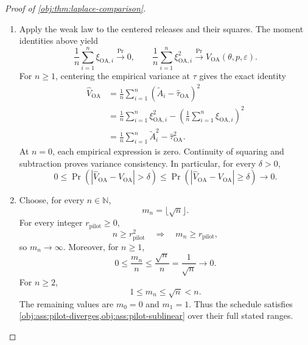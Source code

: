 \begin{proof}[Proof of \cref{obj:thm:laplace-comparison}]
\begin{enumerate}
For every positive integer \(n\), factoring out \(\sqrt n\) from both square roots and canceling the positive common factor \(z_{1-\gamma/2}/\sqrt n\) gives
\[
\begin{aligned}
\frac{z_{1-\gamma/2}\sqrt{V_{\mathrm{OA}}(\theta,p,\varepsilon)/n}}
     {z_{1-\gamma/2}\sqrt{V^*(\theta,p,\varepsilon)/n}}
&=
\frac{\sqrt{V_{\mathrm{OA}}(\theta,p,\varepsilon)}}
     {\sqrt{V^*(\theta,p,\varepsilon)}}\\
&=
\sqrt{\frac{V_{\mathrm{OA}}(\theta,p,\varepsilon)}
           {V^*(\theta,p,\varepsilon)}}.
\end{aligned}
\]
The identities also respect the zero-reciprocal convention. The sequence is consequently equal to its claimed limit for every \(n\ge1\).

\item Apply the weak law to the centered releases and their squares. The moment identities above yield
\[
\frac1n\sum_{i=1}^n\xi_{\mathrm{OA},i}
\xrightarrow{\Pr}0,
\qquad
\frac1n\sum_{i=1}^n\xi_{\mathrm{OA},i}^2
\xrightarrow{\Pr}V_{\mathrm{OA}}(\theta,p,\varepsilon).
\]
For \(n\ge1\), centering the empirical variance at \(\tau\) gives the exact identity
\[
\begin{aligned}
\widehat V_{\mathrm{OA}}
&=
\frac1n\sum_{i=1}^n
(\widetilde A_i-\widehat\tau_{\mathrm{OA}})^2\\
&=
\frac1n\sum_{i=1}^n\xi_{\mathrm{OA},i}^2
-
\left(\frac1n\sum_{i=1}^n\xi_{\mathrm{OA},i}\right)^2\\
&=
\frac1n\sum_{i=1}^n\widetilde A_i^2
-\widehat\tau_{\mathrm{OA}}^2.
\end{aligned}
\]
At \(n=0\), each empirical expression is zero. Continuity of squaring and subtraction proves variance consistency. In particular, for every \(\delta>0\),
\[
0\le
\Pr\!\left(
|\widehat V_{\mathrm{OA}}-V_{\mathrm{OA}}|>\delta
\right)
\le
\Pr\!\left(
|\widehat V_{\mathrm{OA}}-V_{\mathrm{OA}}|\ge\delta
\right)
\longrightarrow0.
\]

\item Choose, for every \(n\in\mathbb N\),
\[
m_n=\lfloor\sqrt n\rfloor.
\]
For every integer \(r_{\mathrm{pilot}}\ge0\),
\[
n\ge r_{\mathrm{pilot}}^2
\quad\Longrightarrow\quad
m_n\ge r_{\mathrm{pilot}},
\]
so \(m_n\to\infty\). Moreover, for \(n\ge1\),
\[
0\le\frac{m_n}{n}
\le\frac{\sqrt n}{n}
=\frac1{\sqrt n}\longrightarrow0.
\]
For \(n\ge2\),
\[
1\le m_n\le\sqrt n<n.
\]
The remaining values are \(m_0=0\) and \(m_1=1\). Thus the schedule satisfies
\cref{obj:ass:pilot-diverges,obj:ass:pilot-sublinear} over their full stated ranges.


\end{enumerate}
\end{proof}
